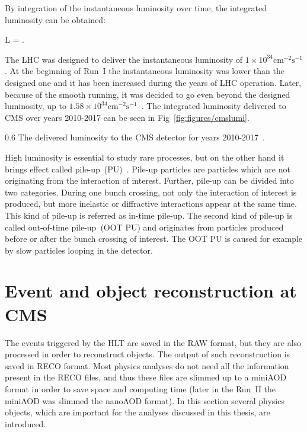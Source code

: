 By integration of the instantaneous luminosity over time, the integrated luminosity can be obtained:

{
 L = .
}

The LHC was designed to deliver the instantaneous luminosity of $1 \times 10^{34} \mathrm{cm^{-2}s^{-1}}$. At the beginning of Run~I the instantaneous luminosity was lower than the designed one and it has been increased during the years of LHC operation. Later, because of the smooth running, it was decided to go even beyond the designed luminosity, up to $1.58 \times 10^{34} \mathrm{cm^{-2}s^{-1}}$~\cite{Pralavorio:2272474}. The integrated luminosity delivered to CMS over years 2010-2017 can be seen in Fig~\ref{fig:figures/cmslumi}.

                 {0.6}       %
                 { The delivered luminosity to the CMS detector for years 2010-2017~\cite{website:CMSlumi}. }


High luminosity is essential to study rare processes, but on the other hand it brings effect called pile-up~(PU)~\cite{Bayatian:2006nff}. Pile-up particles are particles which are not originating from the interaction of interest. Further, pile-up can be divided into two categories. During one bunch crossing, not only the interaction of interest is produced, but more inelastic or diffractive interactions appear at the same time. This kind of pile-up is referred as in-time pile-up. The second kind of pile-up is called out-of-time pile-up~(OOT PU) and originates from particles produced before or after the bunch crossing of interest. The OOT PU is caused for example by slow particles looping in the detector.

\newpage

\section{Event and object reconstruction at CMS~\label{sec:objects}}

The events triggered by the HLT are saved in the RAW format, but they are also processed in order to reconstruct objects. The output of such reconstruction is saved in RECO format. Most physics analyses do not need all the information present in the RECO files, and thus these files are slimmed up to a miniAOD~\cite{Petrucciani:2029414} format in order to save space and computing time (later in the Run~II the miniAOD was slimmed the nanoAOD format). In this section several physics objects, which are important for the analyses discussed in this thesis, are introduced.



